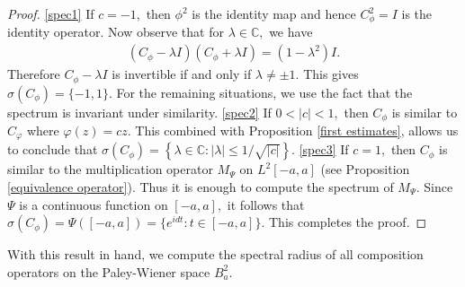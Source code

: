 \documentclass[11pt]{amsart}%
\numberwithin{equation}{section}
\theoremstyle{plain}
\theoremstyle{definition}
\theoremstyle{definition}
\begin{document}
\begin{proof} \ref{spec1} If $c=-1,$ then $\phi^{2}$ is the identity map and hence $C_{\phi}^2=I$ is the identity operator. Now observe that for $\lambda\in \mathbb{C},$ we have
\begin{align*}
(C_{\phi}-\lambda I)(C_{\phi}+\lambda I)=(1-\lambda^2)I.
\end{align*}
Therefore $C_{\phi}-\lambda I$ is invertible if and only if $\lambda \neq \pm1. $ This gives $\sigma(C_{\phi})=\{-1,1\}.$ For the remaining situations, we use the fact that the spectrum is invariant under similarity.
\ref{spec2} If $0<|c|<1,$ then $C_{\phi}$ is similar to  $C_{\varphi}$ where $\varphi(z)=cz.$ This combined with Proposition \ref{first estimates}, allows us to conclude that $\sigma(C_{\phi})=\left\{ \lambda \in \mathbb{C}: |\lambda|\leq 1/\sqrt{|c|} 
\right\}.$ \ref{spec3} If $c=1,$ then  $C_{\phi}$ is similar to the multiplication operator $M_{\Psi}$ on $L^2[-a,a]$ (see Proposition \ref{equivalence operator}). Thus it is enough to compute the spectrum of $M_{\Psi}.$ Since $\Psi$ is a continuous function on $[-a,a],$ it follows that $\sigma(C_{\phi})=\Psi([-a,a])=\{e^{idt}:t\in [-a,a]\}.$ This completes the proof.
\end{proof}

With this result in hand, we compute the spectral radius of all composition operators on the Paley-Wiener space $B^2_a.$
\end{document}

